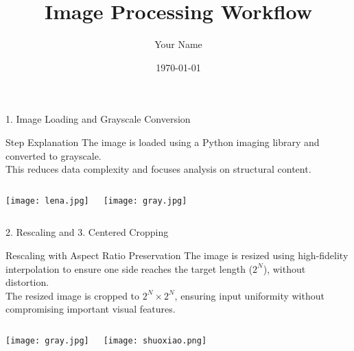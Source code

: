 \documentclass{beamer}
\title{Image Processing Workflow}
\author{Your Name}
\date{\today}
\begin{document}
\frame{\titlepage}

\begin{frame}{1. Image Loading and Grayscale Conversion}
    \begin{block}{Step Explanation}
        The image is loaded using a Python imaging library and converted to grayscale. \\
        This reduces data complexity and focuses analysis on structural content.
    \end{block}

    \vspace{0.5cm}
    \begin{columns}
        \centering
        \texttt{[image: lena.jpg]}

        \centering
        \texttt{[image: gray.jpg]}
    \end{columns}
\end{frame}

\begin{frame}{2. Rescaling and 3. Centered Cropping}
    \begin{block}{Rescaling with Aspect Ratio Preservation}
        The image is resized using high-fidelity interpolation to ensure one side reaches the target length ($2^N$), without distortion. \\
        The resized image is cropped to $2^N \times 2^N$, ensuring input uniformity without compromising important visual features.
    \end{block}

    \vspace{0.3cm}
    \begin{columns}
        \centering
        \texttt{[image: gray.jpg]}

        \centering
        \texttt{[image: shuoxiao.png]}
    \end{columns}
\end{frame}
\end{document}
